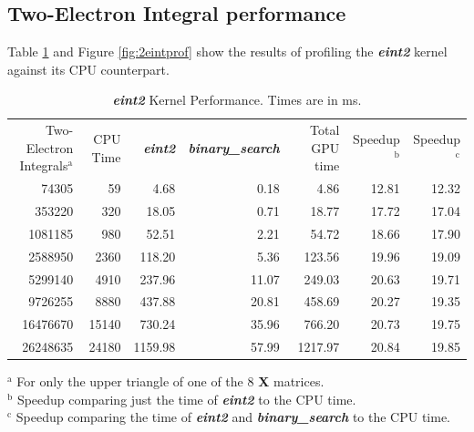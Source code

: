 \documentclass[12pt]{report}
\newcommand{\kernel}[1]{\textit{\textbf{#1}}}
\begin{document}
\subsection{Two-Electron Integral performance}
Table \ref{tab:2eintprof} and Figure \ref{fig:2eintprof} show the results of profiling the \kernel{eint2} kernel against its CPU counterpart.

\begin{table}[h!]
\begin{center}
\caption[\kernel{eint2} Kernel Performance]{\kernel{eint2} Kernel Performance. Times are in ms.}
\label{tab:2eintprof}
\begin{tabular}{rrrrrrr}
\toprule
	\multirow{3}{2cm}{Two-Electron Integrals$^{\textrm{a}}$}	&	\multirow{3}{*}{CPU Time}		&	\multirow{3}{*}{\kernel{eint2}}	&	\multirow{3}{2.4cm}{\kernel{binary\_search}}		&	\multirow{3}{1cm}{Total GPU time}	&	\multirow{3}{*}{Speedup$^{\textrm{b}}$}	&	\multirow{3}{*}{Speedup$^{\textrm{c}}$}	\\
	\\
	\\
\midrule
	74305	&	59		&	4.68		&	0.18		&	4.86		&	12.81	&	12.32	\\
	353220	&	320		&	18.05	&	0.71		&	18.77	&	17.72	&	17.04	\\
	1081185	&	980		&	52.51	&	2.21		&	54.72	&	18.66	&	17.90	\\
	2588950	&	2360		&	118.20	&	5.36		&	123.56	&	19.96	&	19.09	\\
	5299140	&	4910		&	237.96	&	11.07	&	249.03	&	20.63	&	19.71	\\
	9726255	&	8880		&	437.88	&	20.81	&	458.69	&	20.27	&	19.35	\\
	16476670	&	15140	&	730.24	&	35.96	&	766.20	&	20.73	&	19.75	\\
	26248635	&	24180	&	1159.98	&	57.99	&	1217.97	&	20.84	&	19.85	\\
\bottomrule
\end{tabular}
\end{center}
$^{\textrm{a}}$ For only the upper triangle of one of the 8 \textbf{X} matrices. \\
$^{\textrm{b}}$ Speedup comparing just the time of \kernel{eint2} to the CPU time. \\
$^{\textrm{c}}$ Speedup comparing the time of \kernel{eint2} and \kernel{binary\_search} to the CPU time. \\
\end{table}
\end{document}
